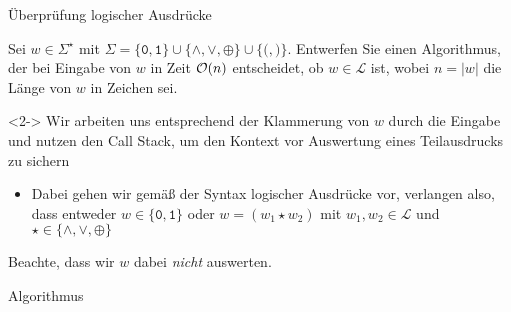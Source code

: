 \begin{frame}{\"Uberpr\"ufung logischer Ausdr\"ucke}
\begin{task}
Sei $w \in \Sigma^{\star}$ mit $\Sigma = \{ \mathtt{0}, \mathtt{1} \} \cup \{ \mathtt{\land}, \mathtt{\lor}, \mathtt{\oplus} \} \cup \{ \mathtt{(}, \mathtt{)} \}$.
Entwerfen Sie einen Algorithmus, der bei Eingabe von $w$ in Zeit $\mathcal{O}(n)$ entscheidet, ob $w \in \mathcal{L}$ ist, wobei $n = |w|$ die L\"ange von $w$ in Zeichen sei.
\end{task}
\begin{solution}<2->
Wir arbeiten uns entsprechend der Klammerung von $w$ durch die Eingabe und nutzen den \alert{Call Stack}, um den Kontext vor Auswertung eines Teilausdrucks zu sichern
\begin{itemize}
    \item Dabei gehen wir gem\"a{\ss} der Syntax logischer Ausdr\"ucke vor, verlangen also, dass entweder $w \in \{ \mathtt{0}, \mathtt{1} \}$ oder $w = (w_1 \star w_2)$ mit $w_1, w_2 \in \mathcal{L}$ und $\star \in \{ \land, \lor, \oplus \}$
\end{itemize}
Beachte, dass wir $w$ dabei \emph{nicht} auswerten.
\end{solution}
\end{frame}

\begin{frame}{Algorithmus}
\begin{algorithm}[H]
	\caption{\"Uberpr\"ufung logischer Ausdr\"ucke}
	\label{sq:alg:check}
	\DontPrintSemicolon
    \begin{multicols}{2}
    \BlankLine
    \BlankLine
    \;
    \end{multicols}
\end{algorithm}
\end{frame}

